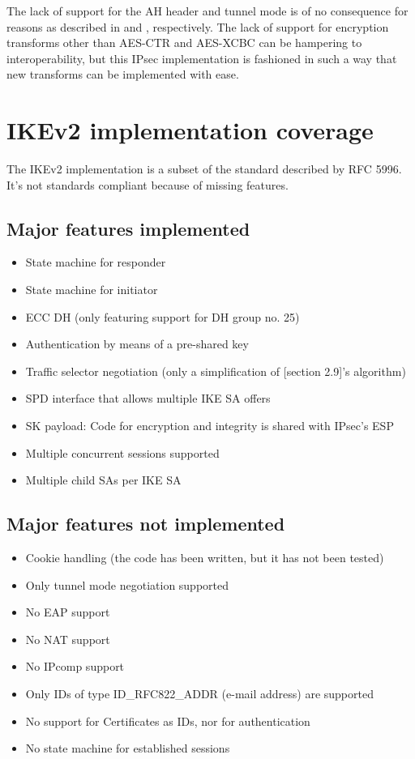 \documentclass[final,a4paper,twoside,11pt,onecolumn]{report}
\begin{document}
The lack of support for the AH header and tunnel mode is of no consequence for reasons as described in  and , respectively. The lack of support for encryption transforms other than AES-CTR and AES-XCBC can be hampering to interoperability, but this IPsec implementation is fashioned in such a way that new transforms can be implemented with ease.

\section{IKEv2 implementation coverage}
\label{sec:ike-impl-coverage}
The IKEv2 implementation is a subset of the standard described by RFC 5996. It's not standards compliant because of missing features.

\subsection{Major features implemented}
\begin{itemize}
   \item State machine for responder
   \item State machine for initiator
   \item ECC DH (only featuring support for DH group no. 25)
   \item Authentication by means of a pre-shared key
   \item Traffic selector negotiation (only a simplification of \citep{rfc5996}[section 2.9]'s algorithm)
   \item SPD interface that allows multiple IKE SA offers
   \item SK payload: Code for encryption and integrity is shared with IPsec's ESP
   \item Multiple concurrent sessions supported
   \item Multiple child SAs per IKE SA
\end{itemize}

\subsection{Major features not implemented}
\begin{itemize}
   \item Cookie handling (the code has been written, but it has not been tested)
   \item Only tunnel mode negotiation supported
   \item No EAP support
   \item No NAT support
   \item No IPcomp support
   \item Only IDs of type ID\_RFC822\_ADDR (e-mail address) are supported
   \item No support for Certificates as IDs, nor for authentication
   \item No state machine for established sessions
\end{itemize}
\end{document}

